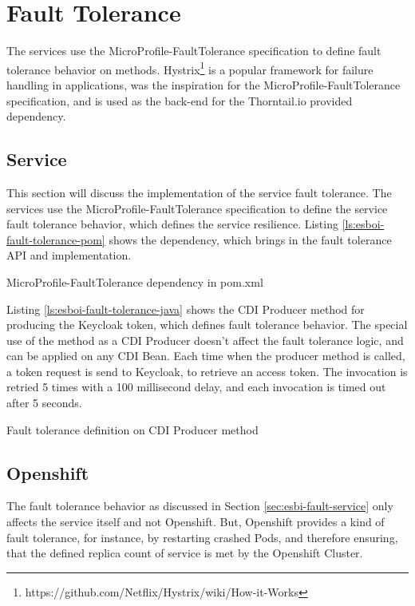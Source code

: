\section{Fault Tolerance}
\label{sec:esbi-fault}
The services use the MicroProfile-FaultTolerance specification to define fault tolerance behavior on methods. Hystrix\footnote{https://github.com/Netflix/Hystrix/wiki/How-it-Works} is a popular framework for failure handling in applications, was the inspiration for the MicroProfile-FaultTolerance specification, and is used as the back-end for the Thorntail.io provided dependency.

\subsection{Service}
\label{sec:esbi-fault-service}
This section will discuss the implementation of the service fault tolerance. The services use the MicroProfile-FaultTolerance specification to define the service fault tolerance behavior, which defines the service resilience. Listing \vref{ls:esboi-fault-tolerance-pom} shows the dependency, which brings in the fault tolerance API and implementation.

\begin{listing}[h]
	\caption{MicroProfile-FaultTolerance dependency in pom.xml}
	\label{ls:esboi-fault-tolerance-pom}
\end{listing}

Listing \vref{ls:esboi-fault-tolerance-java} shows the CDI Producer method for producing the Keycloak token, which defines fault tolerance behavior. The special use of the method as a CDI Producer doesn't affect the fault tolerance logic, and can be applied on any CDI Bean. Each time when the producer method is called, a token request is send to Keycloak, to retrieve an access token. The invocation is retried 5 times with a 100 millisecond delay, and each invocation is timed out after 5 seconds.

\begin{listing}[h]
	\caption{Fault tolerance definition on CDI Producer method}
	\label{ls:esboi-fault-tolerance-java}
\end{listing} 

\subsection{Openshift}
\label{sec:esbi-fault-openshift}
The fault tolerance behavior as discussed in Section \vref{sec:esbi-fault-service} only affects the service itself and not Openshift. But, Openshift provides a kind of fault tolerance, for instance, by restarting crashed Pods, and therefore ensuring, that the defined replica count of service is met by the Openshift Cluster.

